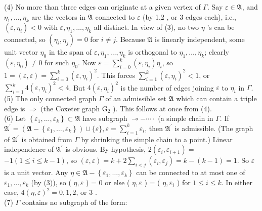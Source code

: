 \documentclass[10pt]{article}
\begin{document}
(4) No more than three edges can originate at a given vertex of $\Gamma$. Say $\varepsilon \in \mathfrak{A}$, and $\eta_{1}, \ldots, \eta_{k}$ are the vectors in $\mathfrak{A}$ connected to $\varepsilon$ (by 1,2 , or 3 edges each), i.e., $\left(\varepsilon, \eta_{i}\right)<0$ with $\varepsilon, \eta_{1}, \ldots, \eta_{k}$ all distinct. In view of (3), no two $\eta$ 's can be connected, so $\left(\eta_{i}, \eta_{j}\right)=0$ for $i \neq j$. Because $\mathfrak{A}$ is linearly independent, some unit vector $\eta_{0}$ in the span of $\varepsilon, \eta_{1}, \ldots, \eta_{k}$ is orthogonal to $\eta_{1}, \ldots, \eta_{k}$; clearly $\left(\varepsilon, \eta_{0}\right) \neq 0$ for such $\eta_{0}$. Now $\varepsilon=\sum_{i=0}^{k}\left(\varepsilon, \eta_{i}\right) \eta_{i}$, so $1=(\varepsilon, \varepsilon)=\sum_{i=0}^{k}\left(\varepsilon, \eta_{i}\right)^{2}$. This forces $\sum_{i=1}^{k}\left(\varepsilon, \eta_{i}\right)^{2}<1$, or $\sum_{i=1}^{k} 4\left(\varepsilon, \eta_{i}\right)^{2}<4$. But $4\left(\varepsilon, \eta_{i}\right)^{2}$ is the number of edges joining $\varepsilon$ to $\eta_{i}$ in $\Gamma$.\\
(5) The only connected graph $\Gamma$ of an admissible set $\mathfrak{A}$ which can contain a triple edge is $\Longrightarrow$ (the Coxeter graph $\mathrm{G}_{2}$ ). This follows at once from (4).\\
(6) Let $\left\{\varepsilon_{1}, \ldots, \varepsilon_{k}\right\} \subset \mathfrak{A}$ have subgraph $\multimap-\cdots \cdot$ (a simple chain in $\Gamma$. If $\mathfrak{A}^{\prime}=\left(\mathfrak{A}-\left\{\varepsilon_{1}, \ldots, \varepsilon_{k}\right\}\right) \cup\{\varepsilon\}, \varepsilon=\sum_{i=1}^{k} \varepsilon_{i}$, then $\mathfrak{A}^{\prime}$ is admissible. (The graph of $\mathfrak{A}^{\prime}$ is obtained from $\Gamma$ by shrinking the simple chain to a point.) Linear independence of $\mathfrak{A}^{\prime}$ is obvious. By hypothesis, $2\left(\varepsilon_{i}, \varepsilon_{i+1}\right)=$ $-1(1 \leq i \leq k-1)$, so $(\varepsilon, \varepsilon)=k+2 \sum_{i<j}\left(\varepsilon_{i}, \varepsilon_{j}\right)=k-(k-1)=1$. So $\varepsilon$ is a unit vector. Any $\eta \in \mathfrak{A}-\left\{\varepsilon_{1}, \ldots, \varepsilon_{k}\right\}$ can be connected to at most one of $\varepsilon_{1}, \ldots, \varepsilon_{k}$ (by (3)), so ( $\eta, \varepsilon$ ) = 0 or else ( $\eta, \varepsilon$ ) = ( $\eta, \varepsilon_{i}$ ) for $1 \leq i \leq k$. In either case, $4(\eta, \varepsilon)^{2}=0,1,2$, or 3 .\\
(7) $\Gamma$ contains no subgraph of the form:\\
\end{document}
